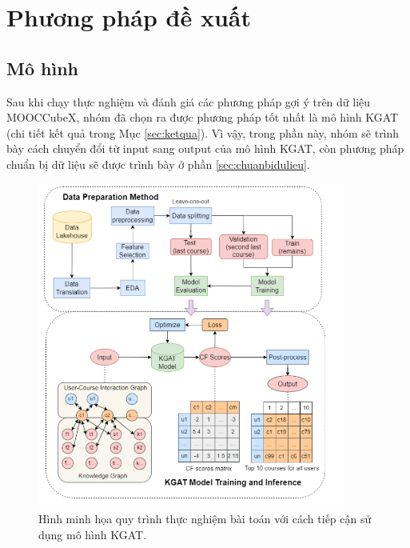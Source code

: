 \section{Phương pháp đề xuất}
\subsection{Mô hình}
Sau khi chạy thực nghiệm và đánh giá các phương pháp gợi ý trên dữ liệu MOOCCubeX, nhóm đã chọn ra được phương pháp tốt nhất là mô hình KGAT (chi tiết kết quả trong Mục \ref{sec:ketqua}). Vì vậy, trong phần này, nhóm sẽ trình bày cách chuyển đổi từ input sang output của mô hình KGAT, còn phương pháp chuẩn bị dữ liệu sẽ được trình bày ở phần \ref{sec:chuanbidulieu}.

\begin{figure}[H]
    \centering
    \includegraphics[width=0.9\textwidth]{figures/69.png}
    \caption{Hình minh họa quy trình thực nghiệm bài toán với cách tiếp cận sử dụng mô hình KGAT.}
    \label{fig:hinh4_1}
\end{figure}

